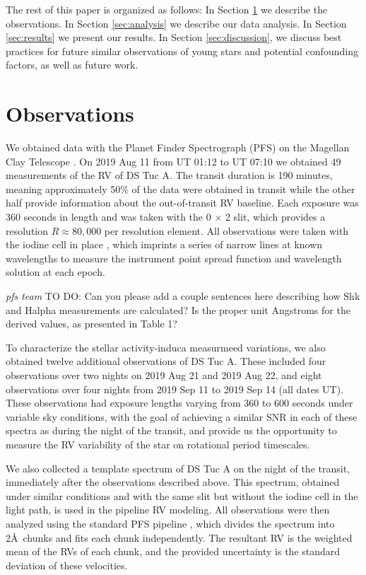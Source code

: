 \documentclass[twocolumn]{aastex63}
\newcommand{\todo}[3]{{\color{#2} \emph{#1} TO DO: #3}}
\begin{document}
The rest of this paper is organized as follows:
In Section \ref{sec:obs} we describe the observations.
In Section \ref{sec:analysis} we describe our data analysis.
In Section \ref{sec:results} we present our results.
In Section \ref{sec:discussion}, we discuss best practices for future similar observations of young stars and potential confounding factors, as well as future work.


\section{Observations}
\label{sec:obs}

We obtained data with the Planet Finder Spectrograph (PFS) on the Magellan Clay Telescope \citep{Crane06, Crane08, Crane10}. 
On 2019 Aug 11 from UT 01:12 to UT 07:10 we obtained 49 measurements of the RV of DS Tuc A. 
The transit duration is 190 minutes, meaning approximately 50\% of the data were obtained in transit while the other half provide information about the out-of-transit RV baseline. Each exposure was 360 seconds in length and was taken with the 0 $\times$ 2 slit, which provides a resolution $R \approx 80,000$ per resolution element. All observations were taken with the iodine cell in place \citep{Marcy92}, which imprints a series of narrow lines at known wavelengths to measure the instrument point spread function and wavelength solution at each epoch.

\todo{pfs team}{red}{Can you please add a couple sentences here describing how Shk and Halpha measurements are calculated? Is the proper unit Angstroms for the derived values, as presented in Table 1?}

To characterize the stellar activity-induca measurmeed variations, we also obtained twelve additional observations of DS Tuc A. These included four observations over two nights on 2019 Aug 21 and 2019 Aug 22, and eight observations over four nights from 2019 Sep 11 to 2019 Sep 14 (all dates UT).
These observations had exposure lengths varying from 360 to 600 seconds under variable sky conditions, with the goal of achieving a similar SNR in each of these spectra as during the night of the transit, and provide us the opportunity to measure the RV variability of the star on rotational period timescales.

We also collected a template spectrum of DS Tuc A on the night of the transit, immediately after the observations described above.
This spectrum, obtained under similar conditions and with the same slit but without the iodine cell in the light path, is used in the pipeline RV modeling.
All observations were then analyzed using the standard PFS pipeline \citep{Butler96}, which divides the spectrum into 2\AA\ chunks and fits each chunk independently.
The resultant RV is the weighted mean of the RVs of each chunk, and the provided uncertainty is the standard deviation of these velocities.
\end{document}
